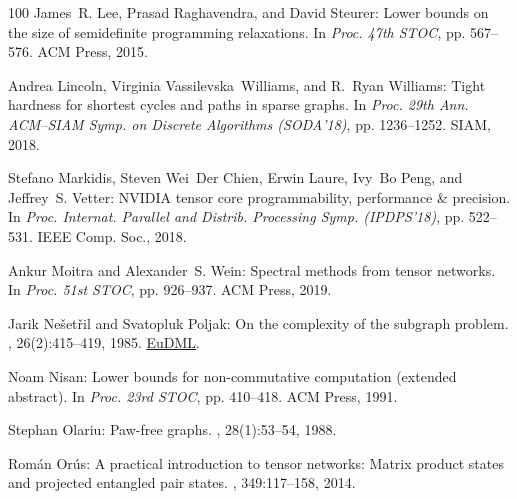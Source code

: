 \begin{thebibliography}{100}
{\sc James~R. Lee, Prasad Raghavendra, and David Steurer}: Lower bounds on the
  size of semidefinite programming relaxations.
\newblock In {\em Proc. 47th STOC}, pp. 567--576. ACM Press, 2015.

{\sc Andrea Lincoln, Virginia Vassilevska~Williams, and R.~Ryan Williams}:
  Tight hardness for shortest cycles and paths in sparse graphs.
\newblock In {\em Proc. 29th Ann. ACM--SIAM Symp. on Discrete Algorithms
  (SODA'18)}, pp. 1236--1252. SIAM, 2018.

{\sc Stefano Markidis, Steven Wei~Der Chien, Erwin Laure, Ivy~Bo Peng, and
  Jeffrey~S. Vetter}: {NVIDIA} tensor core programmability, performance {\&}
  precision.
\newblock In {\em Proc. Internat. Parallel and Distrib. Processing Symp.
  (IPDPS'18)}, pp. 522--531. IEEE Comp. Soc., 2018.

{\sc Ankur Moitra and Alexander~S. Wein}: Spectral methods from tensor
  networks.
\newblock In {\em Proc. 51st STOC}, pp. 926--937. ACM Press, 2019.

{\sc Jarik Ne{\v{s}}et{\v{r}}il and Svatopluk Poljak}: On the complexity of the
  subgraph problem.
,
  26(2):415--419, 1985.
\newblock \href{https://eudml.org/doc/17394}{EuDML}.

{\sc Noam Nisan}: Lower bounds for non-commutative computation (extended
  abstract).
\newblock In {\em Proc. 23rd STOC}, pp. 410--418. ACM Press, 1991.
\newblock [\epfmtdoi{10.1145/103418.103462}]

{\sc Stephan Olariu}: Paw-free graphs.
, 28(1):53--54, 1988.
\newblock [\epfmtdoi{10.1016/0020-0190(88)90143-3}]

{\sc Rom{\'a}n Or{\'u}s}: A practical introduction to tensor networks: {M}atrix
  product states and projected entangled pair states.
, 349:117--158, 2014.


\end{thebibliography}
